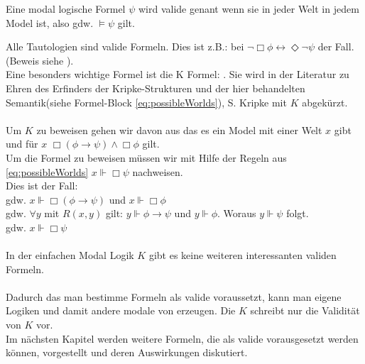 \begin{definition}
	\label{def:valide}
	Eine modal logische Formel $\psi$ wird valide genant wenn sie in jeder Welt in jedem Model \true ist, also gdw. $\vDash \psi$ gilt.
\end{definition}
\cite[S.314]{huth2004logic}
%
Alle Tautologien sind valide Formeln.
Dies ist z.B.: bei $\neg \Box \phi \leftrightarrow \Diamond \neg \psi$ der Fall.
(Beweis siehe \cite[S.314]{huth2004logic}).\\
Eine besonders wichtige Formel ist die K Formel: \KFormel .
Sie wird in der Literatur zu Ehren des Erfinders der Kripke-Strukturen und der hier behandelten \PW Semantik(siehe Formel-Block \eqref{eq:possibleWorlds}), S. Kripke mit $K$ abgekürzt.\\
\\
Um $K$ zu beweisen gehen wir davon aus das es ein Model \modelFormel mit einer Welt $x$ gibt und für $x$ $\Box(\phi \rightarrow \psi) \wedge \Box \phi$ gilt.\\
Um die Formel zu beweisen müssen wir mit Hilfe der Regeln aus \eqref{eq:possibleWorlds} $x \Vdash \Box \psi$ nachweisen.\\
Dies ist der Fall:\\
gdw. $x \Vdash \Box(\phi \rightarrow \psi)$ und $x \Vdash \Box \phi$\\
gdw. $\forall y$ mit $R(x,y)$ gilt: $y \Vdash \phi \rightarrow \psi$ und $y \Vdash \phi$. Woraus $y \Vdash \psi$ folgt.\\
gdw. $x \Vdash \Box \psi$\\
\\
In der einfachen Modal Logik $K$ gibt es keine weiteren interessanten validen Formeln.\cite[S.314]{huth2004logic}\\
\\
Dadurch das man bestimme Formeln als valide voraussetzt, kann man eigene Logiken und damit andere modale von \true erzeugen.
Die \NML $K$ schreibt nur die Validität von $K$ vor.\\
Im nächsten Kapitel werden weitere Formeln, die als valide vorausgesetzt werden können, vorgestellt und deren Auswirkungen diskutiert.









